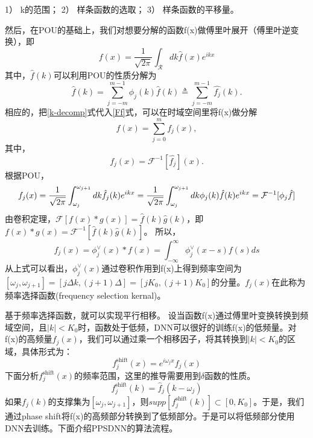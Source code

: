     1） k的范围；
    2） 样条函数的选取；
    3） 样条函数的平移量。


然后，在POU的基础上，我们对想要分解的函数f(x)做傅里叶展开（傅里叶逆变换），即
\begin{equation}
    f(x) = \frac{1}{\sqrt{2\pi}}\int_{\mathcal{R} }^{}dk\hat{f}(x)e^{ikx}  \label{Ff}
\end{equation}
其中，$\hat{f}(k)$可以利用POU的性质分解为
\begin{equation}
\widehat{f}(k)=%
{\displaystyle\sum\limits_{j=-m}^{m-1}}
\phi_{j}(k)\widehat{f}(k)\triangleq%
{\displaystyle\sum\limits_{j=-m}^{m-1}}
\widehat{f_{j}}(k). \label{k-decomp}%
\end{equation}
相应的，把\ref{k-decomp}式代入\ref{Ff}式，可以在时域空间里将f(x)做分解
\begin{equation}
f(x)=%
{\displaystyle\sum\limits_{j=0}^{m}}
f_{j}(x), \label{x-decomp}%
\end{equation}
其中，
\[
f_{j}(x)=\mathcal{F}^{-1}[\widehat{f_{j}}](x).
\]
根据POU，
\begin{equation*}
    f_{j}(x) = \frac{1}{\sqrt{2\pi}}\int_{\omega _j }^{\omega_{j+1}}dk\hat{f_j}(k)e^{ikx}=\\
    \frac{1}{\sqrt{2\pi}}\int_{\omega _j }^{\omega_{j+1}}dk\phi_j(k)\hat{f}(k)e^{ikx}=\mathcal{F}^{-1}[\phi_j \hat{f}]
\end{equation*}
由卷积定理，$\mathcal{F}[f(x)*g(x)] = \hat{f}(k)\hat{g}(k)$，即$f(x)*g(x) = \mathcal{F}^{-1}[\hat{f}(k)\hat{g}(k)]$。
所以，
\begin{equation}
    f_j(x) = \phi_j^{\vee}(x)*f(x)=\int_{-\infty }^{\infty} \phi _j^{\vee}(x-s)f(s)ds
\end{equation}
从上式可以看出，$\phi_j^{\vee}(x)$通过卷积作用到f(x)上得到频率空间为$[\omega_j,\omega_{j+1}]=[j\Delta k,(j+1)\Delta]=[jK_0,(j+1)K_0]$的分量。$f_j(x)$在此称为频率选择函数(frequency selection kernal)。

基于频率选择函数，就可以实现平行相移。
设当函数f(x)通过傅里叶变换转换到频域空间，且$|k|<K_0$时，函数处于低频，DNN可以很好的训练f(x)的低频量。对f(x)的高频量$f_j(x)$，我们可以通过乘一个相移因子，将其转换到$|k|<K_0$的区域，具体形式为：
\begin{equation}
    f_j^{\text{shift}}(x) = e^{i\omega_jx}f_j(x)
\end{equation}
下面分析$f_j^{\text{shift}}(x)$的频率范围，这里的推导需要用到$\delta$函数的性质。
\begin{equation}
    f_j^{\text{shift}}(k) = \hat{f}_j(k-\omega_j)
\end{equation}
如果$f_j(k)$的支撑集为$[\omega_j,\omega_{j+1}]$，则$supp[f_j^{\text{shift}}(k)]\subset [0,K_0]$。于是，我们通过phase shift将f(x)的高频部分转换到了低频部分。于是可以将低频部分使用DNN去训练。下面介绍PPSDNN的算法流程。


